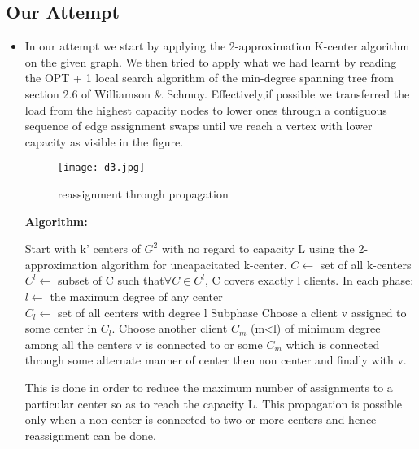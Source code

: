 \documentclass[12pt,a4paper,onecolumn]{article}
\begin{document}
\subsection{Our Attempt}
\begin{itemize}
\item In our attempt we start by applying the 2-approximation K-center algorithm on the given graph. We then tried to apply what we had learnt by reading the OPT + 1 local search algorithm of the min-degree spanning tree from section 2.6 of Williamson \& Schmoy. Effectively,if possible we transferred the load from the highest capacity nodes to lower ones through a contiguous sequence of edge assignment swaps until we reach a vertex with lower capacity as visible in the figure. \\
\begin{figure}[H]
\begin{center}
\texttt{[image: d3.jpg]}
  \caption{reassignment through propagation}
  \label{Figure 13}
\end{center}
\end{figure}
\textbf{Algorithm:}
\begin{algorithmic}[1]
\STATE Start with k' centers of $G^2$ with no regard to capacity L using the 2-approximation algorithm for uncapacitated k-center.
\STATE $C \leftarrow$ set of all k-centers
\STATE $C^l \leftarrow$ subset of C such that$\forall C \in C^l$, C covers exactly l clients.
\STATE In each phase:\\
\STATE \hspace{1cm}$l \leftarrow$ the maximum degree of any center\\
\STATE \hspace{1cm}$C_l \leftarrow$ set of all centers with degree l
\STATE Subphase
\STATE Choose a client v assigned to some center in $C_l$.
\STATE Choose another client $C_m$ (m<l) of minimum degree among all the centers v is connected to or some $C_m$ which is connected through some alternate manner of center then non center and finally with v.
\ENDWHILE
\end{algorithmic}
This is done in order to reduce the maximum number of assignments to a particular center so as to reach the capacity L. This propagation is possible only when a non center is connected to two or more centers and hence reassignment can be done.


\end{itemize}
\end{document}
